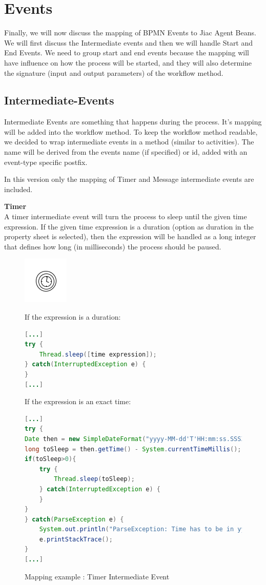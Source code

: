 \section{Events}
Finally, we will now discuss the mapping of BPMN Events to Jiac Agent Beans. We will first discuss the Intermediate events and then we will handle Start and End Events. We need to group start and end events because the mapping will have influence on how the process will be started, and they will also determine the signature (input and output parameters) of the workflow method. 

\subsection{Intermediate-Events}
Intermediate Events are something that happens during the process. It's mapping will be added into the workflow method. To keep the workflow method readable, we decided to wrap intermediate events in a method (similar to activities). The name will be derived from the events name (if specified) or id, added with an event-type specific postfix.

In this version only the mapping of Timer and Message intermediate events are included. 

\textbf{Timer}\\
A timer intermediate event will turn the process to sleep until the given time expression. If the given time expression is a duration (option as duration in the property sheet is selected), then the expression will be handled as a long integer that defines how long (in milliseconds) the process should be paused.
\begin{figure}[h]
\begin{minipage}[c]{0.28\textwidth}
\includegraphics{images/mapping/timer_intermediate.png}
\end{minipage}
\begin{minipage}[c]{0.72\textwidth}
If the expression is a duration:
\begin{lstlisting}[language = Java]
[...]
try {
	Thread.sleep([time expression]);
} catch(InterruptedException e) {
}
[...]
\end{lstlisting}
If the expression is an exact time:
\begin{lstlisting}[language = Java]
[...]
try {
Date then = new SimpleDateFormat("yyyy-MM-dd'T'HH:mm:ss.SSSZ").parse([time expression]);
long toSleep = then.getTime() - System.currentTimeMillis();
if(toSleep>0){
	try {
		Thread.sleep(toSleep);
	} catch(InterruptedException e) {
	}
}
} catch(ParseException e) {
	System.out.println("ParseException: Time has to be in yyyy-MM-dd'T'HH:mm:ss.SSSZ form");
	e.printStackTrace();
}
[...]
\end{lstlisting}
\end{minipage}
\caption{Mapping example : Timer Intermediate Event}%
\label{fig:timer_intermediate}%
\end{figure}

